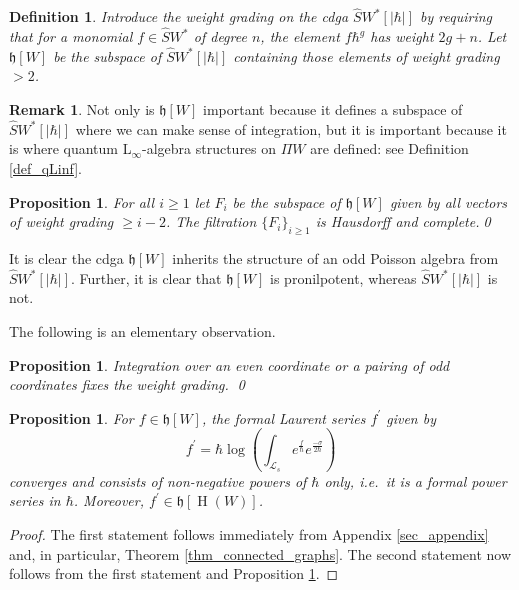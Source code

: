 \documentclass[]{amsart}
\newtheorem{proposition}[theorem]{Proposition}
\newtheorem{definition}[theorem]{Definition}
\theoremstyle{definition}
\newtheorem{remark}[theorem]{Remark}
\newcommand{\Linf}{L$_\infty$}
\newcommand{\homology}{\operatorname{H}}
\begin{document}
\begin{definition}\label{def_h[W]}
Introduce the weight grading on the cdga $\hat{S} W^* [|\hbar |]$ by requiring that for a monomial $f\in \hat{S} W^*$ of degree $n$, the element $f\hbar^g$ has weight $2g + n$. Let $\mathfrak{h}[W]$ be the subspace of $\hat{S} W^* [|\hbar |]$ containing those elements of weight grading $> 2$.
\end{definition}

\begin{remark}
Not only is $\mathfrak{h}[W]$ important because it defines a subspace of $\hat{S} W^* [|\hbar |]$ where we can make sense of integration, but it is important because it is where quantum \Linf-algebra structures on $\Pi W$ are defined: see Definition \ref{def_qLinf}.
\end{remark}

\begin{proposition}\label{prop_weight_grading}
For all $i\geq 1$ let $F_i$ be the subspace of $\mathfrak{h}[W]$ given by all vectors of weight grading $\geq i-2$. The filtration $\lbrace F_i \rbrace_{i\geq 1}$ is Hausdorff and complete.\qed
\end{proposition}

It is clear the cdga $\mathfrak{h}[W]$ inherits the structure of an odd Poisson algebra from $\hat{S} W^*[|\hbar |]$. Further, it is clear that $\mathfrak{h}[W]$ is pronilpotent, whereas $\hat{S} W^*[|\hbar |]$ is not.

The following is an elementary observation.

\begin{proposition}\label{prop_fixed_weight_grading}
Integration over an even coordinate or a pairing of odd coordinates fixes the weight grading.
\qed
\end{proposition}

\begin{proposition}\label{prop_integration_is_power_series}
For $f\in\mathfrak{h}[W]$, the formal Laurent series $f^\prime$ given by
\[
f^\prime= \hbar\log \left( \int_{\mathcal{L}_s} e^{\frac{f}{\hbar}} e^{\frac{-\sigma}{2\hbar}} \right)
\]
converges and consists of non-negative powers of $\hbar$ only, i.e.\ it is a formal power series in $\hbar$. Moreover, $f^\prime\in\mathfrak{h}[\homology (W)]$.
\end{proposition}
\begin{proof}
The first statement follows immediately from Appendix \ref{sec_appendix} and, in particular, Theorem \ref{thm_connected_graphs}. The second statement now follows from the first statement and Proposition \ref{prop_fixed_weight_grading}.
\end{proof}
\end{document}
